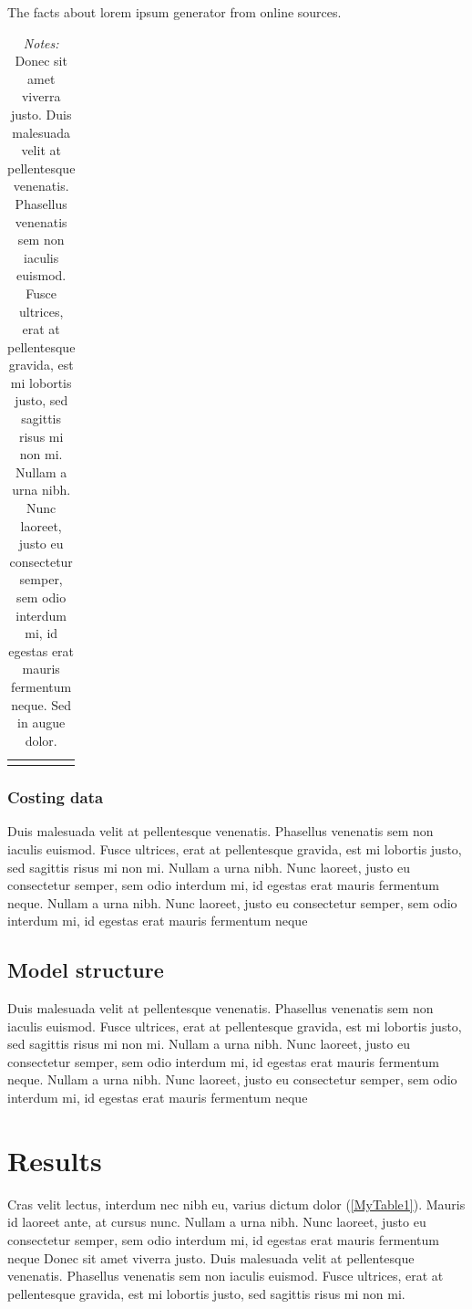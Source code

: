 \documentclass[12pt]{article}
\begin{document}
\hspace{1em}

\begin{table}[H]
    \centering 
    \caption{The facts about lorem ipsum generator from online sources.}
    \begin{tabular}{|C{2cm}|L{10cm}|C{2.5cm}|}
        \hline
    \end{tabular}
    \label{MyTable1}
    \caption*{\footnotesize \textit{Notes:} Donec sit amet viverra justo. Duis malesuada velit at pellentesque venenatis. Phasellus venenatis sem non iaculis euismod. Fusce ultrices, erat at pellentesque gravida, est mi lobortis justo, sed sagittis risus mi non mi. Nullam a urna nibh. Nunc laoreet, justo eu consectetur semper, sem odio interdum mi, id egestas erat mauris fermentum neque. Sed in augue dolor.}
\end{table}


\subsubsection{Costing data}
Duis malesuada velit at pellentesque venenatis. Phasellus venenatis sem non iaculis euismod. Fusce ultrices, erat at pellentesque gravida, est mi lobortis justo, sed sagittis risus mi non mi. Nullam a urna nibh. Nunc laoreet, justo eu consectetur semper, sem odio interdum mi, id egestas erat mauris fermentum neque. Nullam a urna nibh. Nunc laoreet, justo eu consectetur semper, sem odio interdum mi, id egestas erat mauris fermentum neque

\subsection{Model structure}
Duis malesuada velit at pellentesque venenatis. Phasellus venenatis sem non iaculis euismod. Fusce ultrices, erat at pellentesque gravida, est mi lobortis justo, sed sagittis risus mi non mi. Nullam a urna nibh. Nunc laoreet, justo eu consectetur semper, sem odio interdum mi, id egestas erat mauris fermentum neque. Nullam a urna nibh. Nunc laoreet, justo eu consectetur semper, sem odio interdum mi, id egestas erat mauris fermentum neque

\section{Results}
Cras velit lectus, interdum nec nibh eu, varius dictum dolor (\autoref{MyTable1}). Mauris id laoreet ante, at cursus nunc. Nullam a urna nibh. Nunc laoreet, justo eu consectetur semper, sem odio interdum mi, id egestas erat mauris fermentum neque Donec sit amet viverra justo. Duis malesuada velit at pellentesque venenatis. Phasellus venenatis sem non iaculis euismod. Fusce ultrices, erat at pellentesque gravida, est mi lobortis justo, sed sagittis risus mi non mi.
\end{document}
